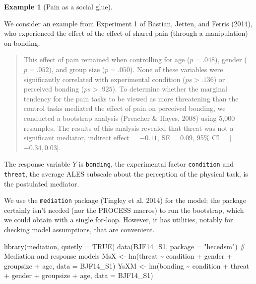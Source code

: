 \documentclass[
  11pt,
  letterpaper,
]{scrbook}
\newenvironment{Shaded}{\begin{snugshade}}{\end{snugshade}}
\newcommand{\AttributeTok}[1]{\textcolor[rgb]{0.40,0.45,0.13}{#1}}
\newcommand{\CommentTok}[1]{\textcolor[rgb]{0.37,0.37,0.37}{#1}}
\newcommand{\ConstantTok}[1]{\textcolor[rgb]{0.56,0.35,0.01}{#1}}
\newcommand{\FunctionTok}[1]{\textcolor[rgb]{0.28,0.35,0.67}{#1}}
\newcommand{\NormalTok}[1]{\textcolor[rgb]{0.00,0.23,0.31}{#1}}
\newcommand{\OtherTok}[1]{\textcolor[rgb]{0.00,0.23,0.31}{#1}}
\newcommand{\SpecialCharTok}[1]{\textcolor[rgb]{0.37,0.37,0.37}{#1}}
\newcommand{\StringTok}[1]{\textcolor[rgb]{0.13,0.47,0.30}{#1}}
\theoremstyle{definition}
\newtheorem{example}{Example}[chapter]
\theoremstyle{definition}
\theoremstyle{remark}
\begin{document}
\begin{example}[Pain as a social
glue]\protect\hypertarget{exm-mediation1}{}\label{exm-mediation1}

We consider an example from Experiment 1 of Bastian, Jetten, and Ferris
(2014), who experienced the effect of the effect of shared pain (through
a manipulation) on bonding.

\begin{quote}
This effect of pain remained when controlling for age (\(p = .048\)),
gender (\(p = .052\)), and group size (\(p = .050\)). None of these
variables were significantly correlated with experimental condition
(\(ps > .136\)) or perceived bonding (\(ps > .925\)). To determine
whether the marginal tendency for the pain tasks to be viewed as more
threatening than the control tasks mediated the effect of pain on
perceived bonding, we conducted a bootstrap analysis (Preacher \& Hayes,
2008) using 5,000 resamples. The results of this analysis revealed that
threat was not a significant mediator, indirect effect = \(-0.11\), SE =
\(0.09\), 95\% CI = {[}\(-0.34, 0.03\){]}.
\end{quote}

The response variable \(Y\) is \texttt{bonding}, the experimental factor
\texttt{condition} and \texttt{threat}, the average ALES subscale about
the perception of the physical task, is the postulated mediator.

We use the \texttt{mediation} package (Tingley et al. 2014) for the
model; the package certainly isn't needed (nor the PROCESS macros) to
run the bootstrap, which we could obtain with a single for-loop.
However, it has utilities, notably for checking model assumptions, that
are convenient.

\begin{Shaded}
\begin{Highlighting}[]
\FunctionTok{library}\NormalTok{(mediation, }\AttributeTok{quietly =} \ConstantTok{TRUE}\NormalTok{)}
\FunctionTok{data}\NormalTok{(BJF14\_S1, }\AttributeTok{package =} \StringTok{"hecedsm"}\NormalTok{)}
\CommentTok{\# Mediation and response models}
\NormalTok{MsX }\OtherTok{\textless{}{-}} \FunctionTok{lm}\NormalTok{(threat }\SpecialCharTok{\textasciitilde{}}\NormalTok{ condition }\SpecialCharTok{+}\NormalTok{ gender }\SpecialCharTok{+}\NormalTok{ groupsize }\SpecialCharTok{+}\NormalTok{ age, }
          \AttributeTok{data =}\NormalTok{ BJF14\_S1)}
\NormalTok{YsXM }\OtherTok{\textless{}{-}} \FunctionTok{lm}\NormalTok{(bonding }\SpecialCharTok{\textasciitilde{}}\NormalTok{ condition }\SpecialCharTok{+}\NormalTok{ threat }\SpecialCharTok{+}\NormalTok{ gender }\SpecialCharTok{+}\NormalTok{ groupsize }\SpecialCharTok{+}\NormalTok{ age,}
           \AttributeTok{data =}\NormalTok{ BJF14\_S1)}
\end{Highlighting}
\end{Shaded}


\end{example}
\end{document}
